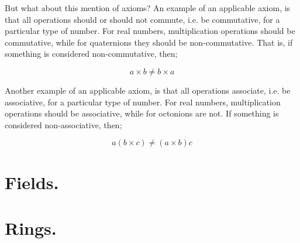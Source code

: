 But what about this mention of axioms? An example of an applicable axiom, is that all operations should or should not
commute, i.e. be commutative, for a particular type of number. For real numbers, multiplication operations should be
commutative, while for quaternions they should be non-commutative. That is, if something is considered non-commutative,
then;

\begin{equation*}
    a \times b \neq b \times a
\end{equation*}
\vspace{0\baselineskip}

Another example of an applicable axiom, is that all operations associate, i.e. be associative, for a particular type of
number. For real numbers, multiplication operations should be associative, while for octonions are not. If something is considered non-associative, then;

\begin{equation*}
    a(b \times c) \neq (a \times b)c
\end{equation*}


\section{Fields.}



\section{Rings.}